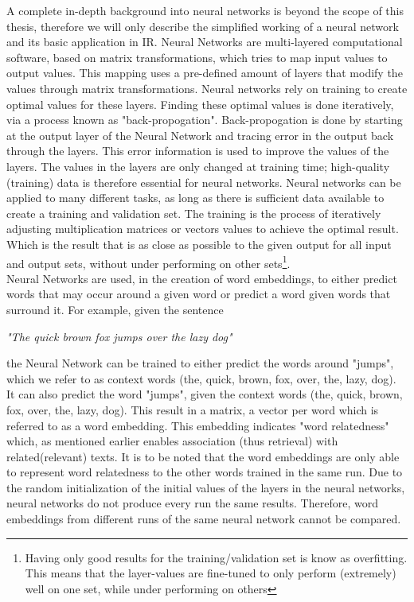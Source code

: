 \documentclass[../../Thesis.tex]{subfiles}
\begin{document}
A complete in-depth background into neural networks is beyond the scope of this thesis, therefore we will only describe the simplified working of a neural network and its basic application in IR.
Neural Networks are multi-layered computational software, based on matrix transformations, which tries to map input values to output values. This mapping uses a pre-defined amount of layers that modify the values through matrix transformations. Neural networks rely on training to create optimal values for these layers. Finding these optimal values is done iteratively, via a process known as "back-propogation". Back-propogation is done by starting at the output layer of the Neural Network and tracing error in the output back through the layers. This error information is used to improve the values of the layers. The values in the layers are only changed at training time; high-quality (training) data is therefore essential for neural networks. Neural networks can be applied to many different tasks, as long as there is sufficient data available to create a training and validation set. The training is the process of iteratively adjusting multiplication matrices or vectors values to achieve the optimal result. Which is the result that is as close as possible to the given output for all input and output sets, without under performing on other sets\footnote{Having only good results for the training/validation set is know as overfitting. This means that the layer-values are fine-tuned to only perform (extremely) well on one set, while under performing on others}.\\Neural Networks are used, in the creation of word embeddings, to either predict words that may occur around a given word or predict a word given words that surround it. For example, given the sentence\\
\begin{center}
\textit{"The quick brown fox jumps over the lazy dog"}
\end{center}
the Neural Network can be trained to either predict the words around "jumps", which we refer to as context words (the, quick, brown, fox, over, the, lazy, dog). It can also predict the word "jumps", given the context words (the, quick, brown, fox, over, the, lazy, dog). This result in a matrix, a vector per word which is referred to as a word embedding. This embedding indicates "word relatedness" which, as mentioned earlier enables association (thus retrieval) with related(relevant) texts. It is to be noted that the word embeddings are only able to represent word relatedness to the other words trained in the same run. Due to the random initialization of the initial values of the layers in the neural networks, neural networks do not produce every run the same results. Therefore, word embeddings from different runs of the same neural network cannot be compared.
\end{document}

